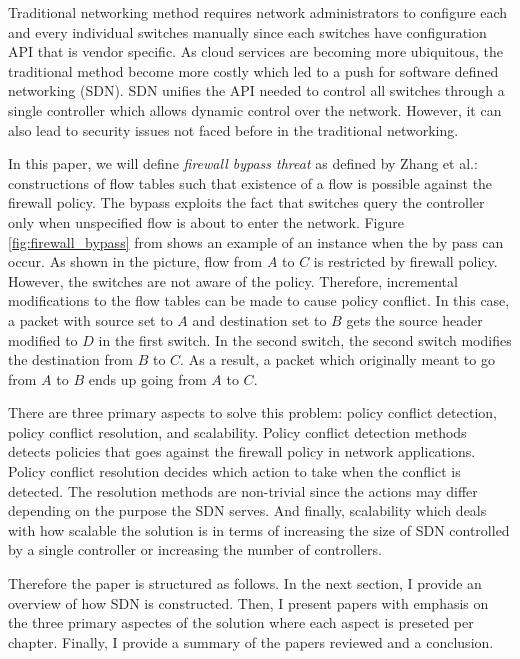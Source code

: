 Traditional networking method requires network administrators to configure each and every individual switches manually since each switches have configuration API that is vendor specific. As cloud services are becoming more ubiquitous, the traditional method become more costly which led to a push for software defined networking (SDN). SDN unifies the API needed to control all switches through a single controller which allows dynamic control over the network. However, it can also lead to security issues not faced before in the traditional networking.



In this paper, we will define \textit{firewall bypass threat} as defined by Zhang et al.\cite{}: constructions of flow tables such that existence of a flow is possible against the firewall policy.
The bypass exploits the fact that switches query the controller only when unspecified flow is about to enter the network.
Figure \ref{fig:firewall_bypass} from \cite{} shows an example of an instance when the by pass can occur.
As shown in the picture, flow from $A$ to $C$ is restricted by firewall policy.
However, the switches are not aware of the policy.
Therefore, incremental modifications to the flow tables can be made to cause policy conflict.
In this case, a packet with source set to $A$ and destination set to $B$ gets the source header modified to $D$ in the first switch.
In the second switch, the second switch modifies the destination from $B$ to $C$.
As a result, a packet which originally meant to go from $A$ to $B$ ends up going from $A$ to $C$.

There are three primary aspects to solve this problem:
policy conflict detection, policy conflict resolution, and scalability.
Policy conflict detection methods detects policies that goes against the firewall policy in network applications.
Policy conflict resolution decides which action to take when the conflict is detected.
The resolution methods are non-trivial since the actions may differ depending on the purpose the SDN serves.
And finally, scalability which deals with how scalable the solution is in terms of increasing the size of SDN controlled by a single controller or increasing the number of controllers.


Therefore the paper is structured as follows.
In the next section, I provide an overview of how SDN is constructed.
Then, I present papers with emphasis on the three primary aspectes of the solution where each aspect is preseted per chapter.
Finally, I provide a summary of the papers reviewed and a conclusion.

